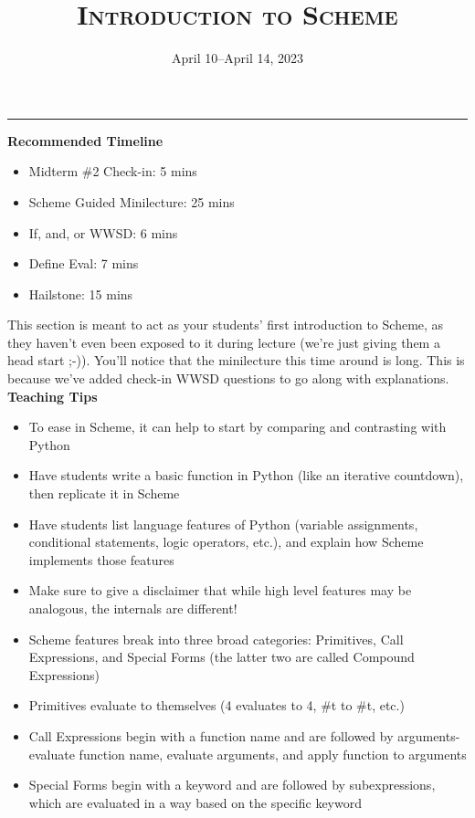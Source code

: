 \documentclass{exam}
\title{\textsc{Introduction to Scheme}}
\date{April 10--April 14, 2023}
\begin{document}
\maketitle
\rule{\textwidth}{0.15em}

\begin{meta}
\begin{blocksection}
    \textbf{Recommended Timeline}
    \begin{itemize}
        \item Midterm \#2 Check-in: 5 mins
        \item Scheme Guided Minilecture: 25 mins
        \item If, and, or WWSD: 6 mins
        \item Define Eval: 7 mins
        \item Hailstone: 15 mins
    \end{itemize}
\end{blocksection}
\end{meta}
\begin{meta}
    This section is meant to act as your students' first introduction to Scheme, as they haven't even been exposed to it during lecture (we're just giving them a head start ;-)). You'll notice that the minilecture this time around is long. This is because we've added check-in WWSD questions to go along with explanations.
\textbf{Teaching Tips}
\begin{itemize}
    \item To ease in Scheme, it can help to start by comparing and contrasting with Python
    \item Have students write a basic function in Python (like an iterative countdown), then replicate it in Scheme
    \item Have students list language features of Python (variable assignments, conditional statements, logic operators, etc.), and explain how Scheme implements those features
    \item Make sure to give a disclaimer that while high level features may be analogous, the internals are different!
    \item Scheme features break into three broad categories: Primitives, Call Expressions, and Special Forms (the latter two are called Compound Expressions)
    \item Primitives evaluate to themselves (4 evaluates to 4, \#t to \#t, etc.)
    \item Call Expressions begin with a function name and are followed by arguments- evaluate function name, evaluate arguments, and apply function to arguments
    \item Special Forms begin with a keyword and are followed by subexpressions, which are evaluated in a way based on the specific keyword
\end{itemize}
\end{meta}
\end{document}
